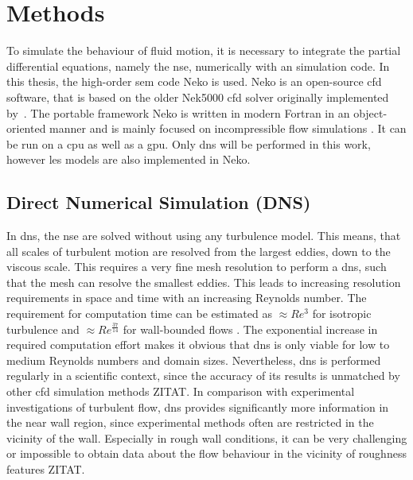 \chapter{Methods}\label{chap: Methods}

To simulate the behaviour of fluid motion, it is necessary to integrate the partial differential equations, namely the \acrlong{nse}, numerically with an simulation code.
In this thesis, the high-order \acrfull{sem} code Neko is used.
Neko is an open-source \acrfull{cfd} software, that is based on the older Nek5000 \acrshort{cfd} solver originally implemented by~\cite{fischerNek500WebPage}.
The portable framework Neko is written in modern Fortran in an object-oriented manner and is mainly focused on incompressible flow simulations \citep{janssonNekoModernPortable2024}.
It can be run on a \acrfull{cpu} as well as a \acrfull{gpu}.
Only \acrfull{dns} will be performed in this work, however \acrfull{les} models are also implemented in Neko.

\section{Direct Numerical Simulation (DNS)}
In \acrshort{dns}, the \acrlong{nse} are solved without using any turbulence model.
This means, that all scales of turbulent motion are resolved from the largest eddies, down to the viscous scale.
This requires a very fine mesh resolution to perform a \acrshort{dns}, such that the mesh can resolve the smallest eddies.
This leads to increasing resolution requirements in space and time with an increasing Reynolds number.
The requirement for computation time can be estimated as  $\approx Re^3$ for isotropic turbulence and $\approx Re^\frac{37}{14}$ for wall-bounded flows \citep{choiGridpointRequirementsLarge2012}.
The exponential increase in required computation effort makes it obvious that \acrshort{dns} is only viable for low to medium Reynolds numbers and domain sizes.
Nevertheless, \acrshort{dns} is performed regularly in a scientific context, since the accuracy of its results is unmatched by other \acrshort{cfd} simulation methods ZITAT.
In comparison with experimental investigations of turbulent flow, \acrshort{dns} provides significantly more information in the near wall region, since experimental methods often are restricted in the vicinity of the wall.
Especially in rough wall conditions, it can be very challenging or impossible to obtain data about the flow behaviour in the vicinity of roughness features ZITAT.

